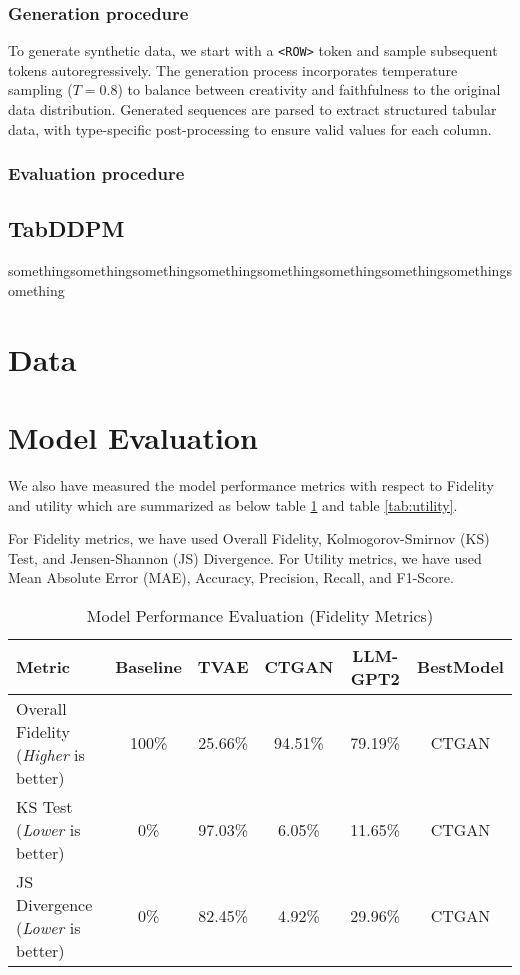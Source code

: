 \documentclass{article}
\begin{document}
\subsubsection[short]{Generation procedure}
To generate synthetic data, we start with a \texttt{<ROW>} token and sample subsequent tokens autoregressively. The generation process incorporates temperature sampling ($T=0.8$) to balance between creativity and faithfulness to the original data distribution. Generated sequences are parsed to extract structured tabular data, with type-specific post-processing to ensure valid values for each column.

\subsubsection[short]{Evaluation procedure}
\subsection{TabDDPM}
somethingsomethingsomethingsomethingsomethingsomethingsomethingsomethingsomething


\section{Data}  

\section{Model Evaluation}
We also have measured the model performance metrics with respect to Fidelity and utility which are summarized as below table \ref{tab:fidelity} and table \ref{tab:utility}.

For Fidelity metrics, we have used Overall Fidelity, Kolmogorov-Smirnov (KS) Test, and Jensen-Shannon (JS) Divergence. For Utility metrics, we have used Mean Absolute Error (MAE), Accuracy, Precision, Recall, and F1-Score.
\begin{table}[!ht]
\centering
\renewcommand{\arraystretch}{1.3}
\begin{tabular}{|l|c|c|c|c|c|}
\hline
\rowcolor[gray]{0.9}
\textbf{Metric} & \textbf{Baseline} & \textbf{TVAE} & \textbf{CTGAN} & \textbf{LLM-GPT2} & \textbf{BestModel}\\ \hline
Overall Fidelity (\textit{Higher} is better) & 100\% & 25.66\% & 94.51\% & 79.19\% & CTGAN \\ \hline
KS Test (\textit{Lower} is better) & 0\% & 97.03\% & 6.05\% & 11.65\% & CTGAN \\ \hline
JS Divergence (\textit{Lower} is better) & 0\% & 82.45\% & 4.92\% & 29.96\% & CTGAN \\ \hline
\end{tabular}
\caption{Model Performance Evaluation (Fidelity Metrics)}
\label{tab:fidelity}
\end{table}
\end{document}
